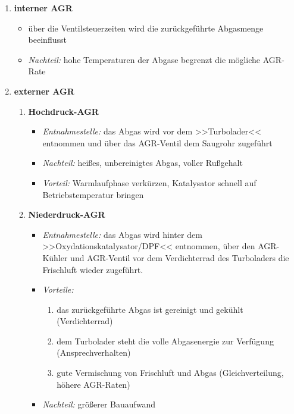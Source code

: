 \begin{enumerate}
\item
  \textbf{interner AGR}

  \begin{itemize}
  \item
    über die Ventilsteuerzeiten wird die zurückgeführte Abgasmenge
    beeinflusst
  \item
    \emph{Nachteil:} hohe Temperaturen der Abgase begrenzt die mögliche
    AGR-Rate
  \end{itemize}
\item
  \textbf{externer AGR}

  \begin{enumerate}
  \def\labelenumii{\arabic{enumii}.}
  \item
    \textbf{Hochdruck-AGR}

    \begin{itemize}
    \item
      \emph{Entnahmestelle:} das Abgas wird vor dem >>Turbolader<<
      entnommen und über das AGR-Ventil dem Saugrohr zugeführt
    \item
      \emph{Nachteil:} heißes, unbereinigtes Abgas, voller Rußgehalt
    \item
      \emph{Vorteil:} Warmlaufphase verkürzen, Katalysator schnell auf
      Betriebstemperatur bringen
    \end{itemize}
  \item
    \textbf{Niederdruck-AGR}

    \begin{itemize}
    \item
      \emph{Entnahmestelle:} das Abgas wird hinter dem
      >>Oxydationskatalysator/DPF<< entnommen, über den AGR-Kühler und
      AGR-Ventil vor dem Verdichterrad des Turboladers die Frischluft
      wieder zugeführt.
    \item
      \emph{Vorteile:}

      \begin{enumerate}
      \def\labelenumiii{\arabic{enumiii}.}
      \item
        das zurückgeführte Abgas ist gereinigt und gekühlt
        (Verdichterrad)
      \item
        dem Turbolader steht die volle Abgasenergie zur Verfügung
        (Ansprechverhalten)
      \item
        gute Vermischung von Frischluft und Abgas (Gleichverteilung,
        höhere AGR-Raten)
      \end{enumerate}
    \item
      \emph{Nachteil:} größerer Bauaufwand
    \end{itemize}
  \end{enumerate}
\end{enumerate}

